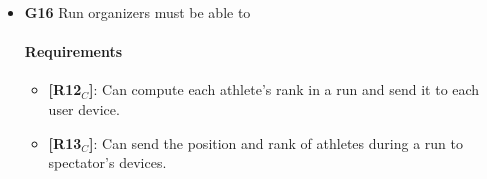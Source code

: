\begin{itemize}
       \item \textbf{G16} Run organizers must be able to 
    \paragraph{Requirements}
   \begin{itemize}
    \item \textbf{[R12$_C$]}: Can compute each athlete's rank in a run and send it to each user device.
    \item \textbf{[R13$_C$]}: Can send the position and rank of athletes during a run to spectator's devices.
   \end{itemize}
   
   \end{itemize}

   
   